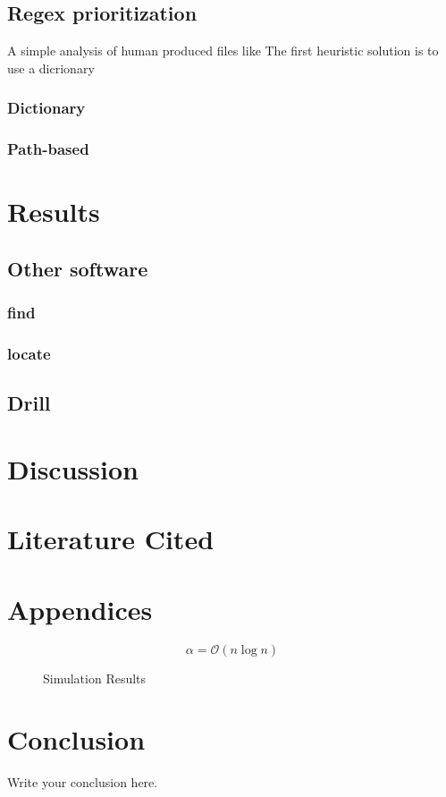 \documentclass{article}
\newcommand{\bigO}{\mathcal{O}}
\begin{document}
\subsection{Regex prioritization}

A simple analysis of human produced files like 
The first heuristic solution is to use a dicrionary 

\subsubsection{Dictionary}
\subsubsection{Path-based}








\section{Results}

\subsection{Other software}

\subsubsection{find}

\subsubsection{locate}

\subsection{Drill}

\section{Discussion}

\section{Literature Cited}



\section{Appendices}

\begin{equation}
    \label{simple_equation}
    \alpha = \bigO(n\log n)
\end{equation}



\begin{figure}
    \centering
    \caption{Simulation Results}
    \label{simulationfigure}
\end{figure}

\section{Conclusion}
Write your conclusion here.
\end{document}
